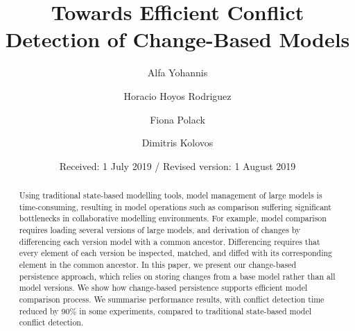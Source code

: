 
\renewcommand{\labelitemi}{$\bullet$}
\newcommand{\AndA}{\textnormal{\textbf{and }}}
\newcommand{\Is}{\textnormal{\textbf{is }}}
\newcommand{\Not}{\textnormal{\textbf{not }}}
\newcommand{\In}{\textnormal{\textbf{in }}}
\newcommand{\Or}{\textnormal{\textbf{or }}}
\newcommand{\eqnum}{\refstepcounter{equation}\textup{\tagform@{\theequation}}}

%
%

%
\title{Towards Efficient Conflict Detection of Change-Based Models}
\author{Alfa Yohannis \and Horacio Hoyos Rodriguez \and Fiona Polack \and Dimitris Kolovos%
}                     %
%
\offprints{}          %
%
%
\date{Received: 1 July 2019 / Revised version: 1 August 2019}
%
\maketitle
%
\begin{abstract}
Using traditional state-based modelling tools, model management of large models is time-consuming, resulting in model operations such as comparison suffering significant bottlenecks in collaborative modelling environments.  For example, model comparison requires loading several versions of large models, and derivation of changes by differencing each version model with a common ancestor.  Differencing requires that every element of each version be inspected, matched, and diffed with its corresponding element in the common ancestor. In this paper, we present our change-based persistence approach, which relies on storing changes from a base model rather than all model versions. We show how change-based persistence supports efficient model comparison process. We summarise performance results, with conflict detection time reduced by 90\% in some experiments, compared to traditional state-based model conflict detection.
\end{abstract}
%

